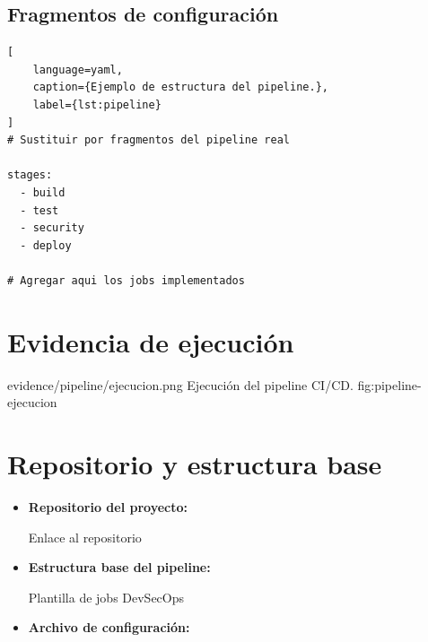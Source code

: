 \subsection{Fragmentos de configuración}

\begin{lstlisting}[
    language=yaml,
    caption={Ejemplo de estructura del pipeline.},
    label={lst:pipeline}
]
# Sustituir por fragmentos del pipeline real

stages:
  - build
  - test
  - security
  - deploy

# Agregar aqui los jobs implementados
\end{lstlisting}

\section{Evidencia de ejecución}


\evidencefigure
{evidence/pipeline/ejecucion.png}
{Ejecución del pipeline CI/CD.}
{fig:pipeline-ejecucion}

\section{Repositorio y estructura base}

\begin{itemize}
    \item \textbf{Repositorio del proyecto:}

    {Enlace al repositorio}

    \item \textbf{Estructura base del pipeline:}

    {Plantilla de jobs DevSecOps}

    \item \textbf{Archivo de configuración:}

\end{itemize}
